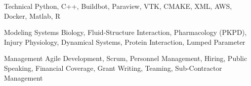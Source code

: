 
\begin{cvskills}
  \cvskill
    {Technical} %
    {Python, C++, Buildbot, Paraview, VTK, CMAKE, XML, AWS, Docker, Matlab, R} %

  \cvskill
    {Modeling} %
    {Systems Biology, Fluid-Structure Interaction, Pharmacology (PKPD), Injury Physiology, Dynamical Systems, Protein Interaction, Lumped Parameter} %

    \cvskill
    {Management} %
    {Agile Development, Scrum, Personnel Management, Hiring, Public Speaking, Financial Coverage, Grant Writing, Teaming, Sub-Contractor Management} %
\end{cvskills}
\pagebreak
